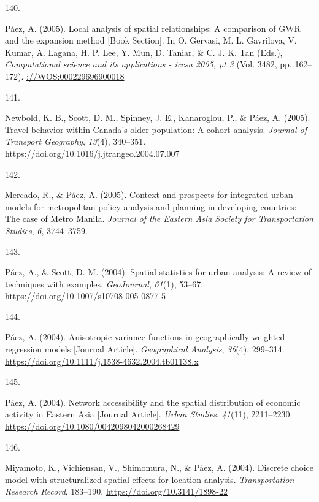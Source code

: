 \documentclass[11pt,a4paper,]{awesome-cv}
\newlength{\cslhangindent}
\newlength{\csllabelwidth}
\newenvironment{CSLReferences}[2] %
 {\begin{list}{}{%
  \setlength{\itemindent}{0pt}
  \setlength{\leftmargin}{0pt}
  \setlength{\parsep}{0pt}
  \ifodd #1
   \setlength{\leftmargin}{\cslhangindent}
   \setlength{\itemindent}{-1\cslhangindent}
  \fi
  \setlength{\itemsep}{#2\baselineskip}}}
 {\end{list}}
\newcommand{\CSLLeftMargin}[1]{\parbox[t]{\csllabelwidth}{\strut#1\strut}}
\newcommand{\CSLRightInline}[1]{\parbox[t]{\linewidth - \csllabelwidth}{\strut#1\strut}}
\begin{document}
\begin{CSLReferences}{0}{0}
\CSLLeftMargin{140. }%
\CSLRightInline{Páez, A. (2005). Local analysis of spatial
relationships: A comparison of GWR and the expansion method {[}Book
Section{]}. In O. Gervasi, M. L. Gavrilova, V. Kumar, A. Lagana, H. P.
Lee, Y. Mun, D. Taniar, \& C. J. K. Tan (Eds.), \emph{Computational
science and its applications - iccsa 2005, pt 3} (Vol. 3482, pp.
162--172). \url{://WOS:000229696900018}}

\CSLLeftMargin{141. }%
\CSLRightInline{Newbold, K. B., Scott, D. M., Spinney, J. E.,
Kanaroglou, P., \& Páez, A. (2005). Travel behavior within Canada's
older population: A cohort analysis. \emph{Journal of Transport
Geography}, \emph{13}(4), 340--351.
\url{https://doi.org/10.1016/j.jtrangeo.2004.07.007}}

\CSLLeftMargin{142. }%
\CSLRightInline{Mercado, R., \& Páez, A. (2005). Context and prospects
for integrated urban models for metropolitan policy analysis and
planning in developing countries: The case of Metro Manila.
\emph{Journal of the Eastern Asia Society for Transportation Studies},
\emph{6}, 3744--3759.}

\CSLLeftMargin{143. }%
\CSLRightInline{Páez, A., \& Scott, D. M. (2004). Spatial statistics for
urban analysis: A review of techniques with examples. \emph{GeoJournal},
\emph{61}(1), 53--67. \url{https://doi.org/10.1007/s10708-005-0877-5}}

\CSLLeftMargin{144. }%
\CSLRightInline{Páez, A. (2004). Anisotropic variance functions in
geographically weighted regression models {[}Journal Article{]}.
\emph{Geographical Analysis}, \emph{36}(4), 299--314.
\url{https://doi.org/10.1111/j.1538-4632.2004.tb01138.x}}

\CSLLeftMargin{145. }%
\CSLRightInline{Páez, A. (2004). Network accessibility and the spatial
distribution of economic activity in Eastern Asia {[}Journal Article{]}.
\emph{Urban Studies}, \emph{41}(11), 2211--2230.
\url{https://doi.org/10.1080/0042098042000268429}}

\CSLLeftMargin{146. }%
\CSLRightInline{Miyamoto, K., Vichiensan, V., Shimomura, N., \& Páez, A.
(2004). Discrete choice model with structuralized spatial effects for
location analysis. \emph{Transportation Research Record}, 183--190.
\url{https://doi.org/10.3141/1898-22}}


\end{CSLReferences}
\end{document}
